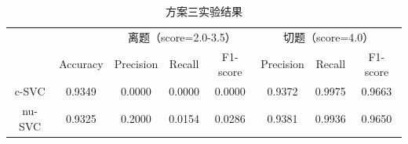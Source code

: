 \documentclass[11pt]{article}
\begin{document}
\begin{CJK}{UTF8}{gkai}
\begin{table}[htbp]\small
  \centering
  \begin{tabular}{cccccccc}
    \hline
    \multirow{2}[0]{*}{} &       & \multicolumn{3}{c}{离题（score=2.0-3.5）} & \multicolumn{3}{c}{切题（score=4.0）} \\
    & Accuracy & Precision & Recall & F1-score & Precision & Recall & F1-score \\
    \hline
    c-SVC & 0.9349  & 0.0000  & 0.0000  & 0.0000  & 0.9372  & 0.9975  & 0.9663  \\
    \hline
    nu-SVC & 0.9325  & 0.2000  & 0.0154  & 0.0286  & 0.9381  & 0.9936  & 0.9650  \\
    \hline
  \end{tabular}%
  \caption{方案三实验结果}
  \label{tab:addlabel}%
\end{table}%


\end{CJK}
\end{document}
